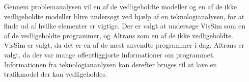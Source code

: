 \vspace{5mm}

Gennem problemanalysen vil en af de vedligeholdte modeller og en af de ikke vedligeholdte modeller blive undersøgt ved hjælp af en teknologianalysen, for at finde ud af hvilke elementer er vigtige. Der er valgt at undersøge VisSim som en af de vedligeholdte programmer, og Altrans som en af de ikke vedligeholdte. VisSim er valgt, da det er en af de mest anvendte programmer i dag. Altrans er valgt, da der var mange offentliggjorte informationer om programmet. Informationen fra teknologiananlysen kan derefter bruges til at lave en trafikmodel der kan vedligeholdes.